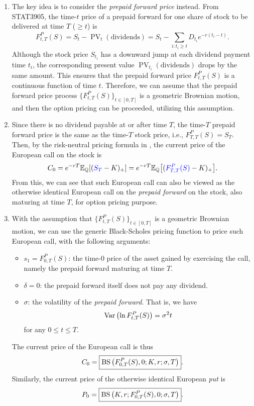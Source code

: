 \begin{enumerate}
\item The key idea is to consider the \emph{prepaid forward price} instead.
From STAT3905, the time-\(t\) price of a prepaid forward for one share of stock to be
delivered at time \(T\) (\(\ge t\)) is
\[
F_{t,T}^{P}(S)=S_t-\operatorname{PV}_{t}(\text{dividends})
=S_t-\sum_{i:t_i\ge t}^{}D_{t_i}e^{-r(t_i-t)}.
\]
Although the stock price \(S_{t_i}\) has a downward jump at each dividend
payment time \(t_i\), the corresponding present value
\(\operatorname{PV}_{t_i}(\text{dividends})\) drops by the same amount. This
ensures that the prepaid forward price \(F_{t,T}^{P}(S)\) is a continuous
function of time \(t\). Therefore, we can assume that the prepaid forward price
process \(\{F_{t,T}^{P}(S)\}_{t\in[0,T]}\) is a geometric Brownian motion, and
then the option pricing can be proceeded, utilizing this assumption.

\item Since there is no dividend payable at or after time \(T\), the time-\(T\)
prepaid forward price is the same as the time-\(T\) stock price, i.e.,
\(F_{T,T}^{P}(S)=S_T\). Then, by the risk-neutral pricing formula in
, the current price of the European call on
the stock is
\[
C_0=e^{-rT}\mathbb{E}_{\mathbb{Q}}\qty[({\color{blue}S_T}-K)_{+}]
=e^{-rT}\mathbb{E}_{\mathbb{Q}}\qty[({\color{blue}F_{T,T}^{P}(S)}-K)_{+}].
\]
From this, we can see that such European call can also be viewed as the
otherwise identical European call on the \emph{prepaid forward} on the stock,
also maturing at time \(T\), for option pricing purpose.

\item \label{it:bs-fmla-stock-disc-div}
With the assumption that \(\{F_{t,T}^{P}(S)\}_{t\in[0,T]}\) is a
geometric Brownian motion, we can use the generic Black-Scholes pricing
function to price such European call, with the following arguments:
\begin{itemize}
\item \(s_1=F_{0,T}^{P}(S)\): the time-0 price of the asset gained by
exercising the call, namely the prepaid forward maturing at time \(T\).
\item \(\delta=0\): the prepaid forward itself  does not pay any
dividend.
\item \(\sigma\): the volatility of the \emph{prepaid forward}. That is, we
have
\[
\operatorname{Var}\qty(\ln F_{t,T}^{P}(S))=\sigma^2 t
\]
for any \(0\le t\le T\).
\end{itemize}
The current price of the European call is thus
\[
C_0=\boxed{\operatorname{BS}\qty(F_{0,T}^{P}(S),0;K,r;\sigma,T)}.
\]
Similarly, the current price of the otherwise identical European \emph{put} is
\[
P_0=\boxed{\operatorname{BS}\qty(K,r;F_{0,T}^{P}(S),0;\sigma,T)}.
\]
\end{enumerate}
